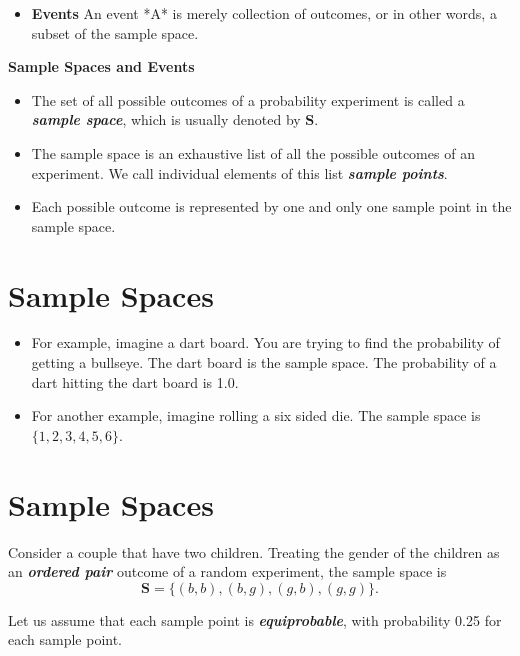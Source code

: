 \documentclass[]{report}
\begin{document}
{\begin{itemize}
\item \textbf{Events}
An event *A* is merely collection of outcomes, or in other words, a subset of the sample space.
\end{itemize}

\textbf{Sample Spaces and Events}
\begin{itemize}
\item  The set of all possible outcomes of a probability experiment is called a \textbf{\emph{sample space}}, which is usually denoted by $\boldsymbol{S}$.
\item  The sample space is an exhaustive list of all the possible outcomes of an experiment. We call individual elements of this list \textbf{\emph{sample points}}.
\item  Each possible outcome is represented by one and only one sample point in the sample space.
\end{itemize}

\section{Sample Spaces}

\begin{itemize}
\itemA complete list of all possible outcomes of a random experiment is called \textbf{sample space }or possibility space and is denoted by $\mathcal{S}$.


\itemA sample space is a set or collection of outcome of a particular random experiment.

\item For example, imagine a dart board. You are trying to find the probability of getting a bullseye. The dart board is the sample space. The probability of a dart hitting the dart board is 1.0.
\item For another example, imagine rolling a six sided die. The sample space is $\{1, 2, 3, 4, 5, 6\}$.
\end{itemize}

\section{Sample Spaces}
Consider a couple that have two children. Treating the gender of the children as an \textit{\textbf{ordered pair}} outcome of a random experiment, the sample space is 
\[\boldsymbol{S} = \{ (b,b), (b,g), (g,b), (g,g)\}.\]

Let us assume that each sample point is \textit{\textbf{equiprobable}}, with probability 0.25 for each sample point.



}
\end{document}
